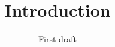 \documentclass[a4paper,english]{report}
\begin{document}
\title{Introduction}
\subtitle{First draft}


%
%


\end{document}
